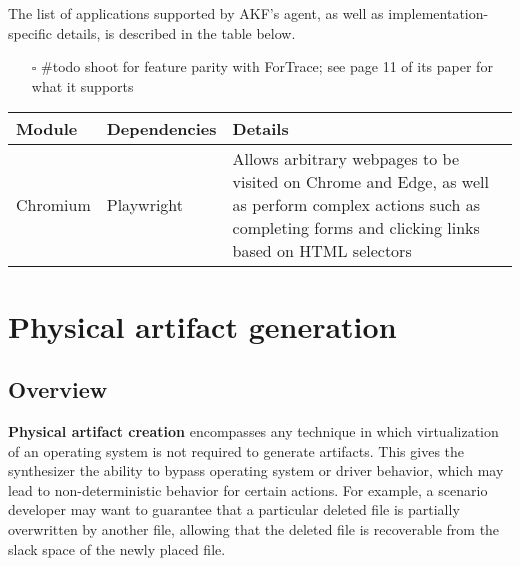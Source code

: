 \documentclass[letterpaper,12pt]{report}
\def\tightlist{}
\begin{document}
The list of applications supported by AKF's agent, as well as
implementation-specific details, is described in the table below.

\begin{itemize}
\tightlist
\item[$\square$]
  \#todo shoot for feature parity with ForTrace; see page 11 of its
  paper for what it supports
\end{itemize}

\begin{longtable}[]{@{}
  >{\raggedright\arraybackslash}p{}
  >{\raggedright\arraybackslash}p{}
  >{\raggedright\arraybackslash}p{}@{}}
\toprule\noalign{}
\begin{minipage}[b]{\linewidth}\raggedright
Module
\end{minipage} & \begin{minipage}[b]{\linewidth}\raggedright
Dependencies
\end{minipage} & \begin{minipage}[b]{\linewidth}\raggedright
Details
\end{minipage} \\
\midrule\noalign{}
\endhead
\bottomrule\noalign{}
\endlastfoot
Chromium & Playwright \cite{MicrosoftPlaywrightpython2025} & Allows
arbitrary webpages to be visited on Chrome and Edge, as well as perform
complex actions such as completing forms and clicking links based on
HTML selectors \\
\end{longtable}

\section{Physical artifact
generation}\label{physical-artifact-generation}

\subsection{Overview}\label{overview-1}

\textbf{Physical artifact creation} encompasses any technique in which
virtualization of an operating system is not required to generate
artifacts. This gives the synthesizer the ability to bypass operating
system or driver behavior, which may lead to non-deterministic behavior
for certain actions. For example, a scenario developer may want to
guarantee that a particular deleted file is partially overwritten by
another file, allowing that the deleted file is recoverable from the
slack space of the newly placed file.
\end{document}
